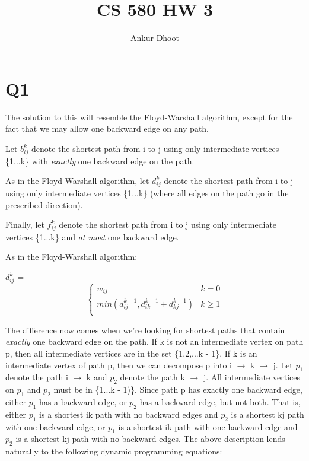 \documentclass[11pt,a4paper]{article}
\begin{document}
\author{Ankur Dhoot}
\title{CS 580 HW 3}
\maketitle

\section*{Q1}
The solution to this will resemble the Floyd-Warshall algorithm, except for the fact that we may allow one backward edge on any path. 

Let $b_{ij}^{k}$ denote the shortest path from i to j using only intermediate vertices \{1...k\} with \textit{exactly} one backward edge on the path. 

As in the Floyd-Warshall algorithm, let $d_{ij}^{k}$ denote the shortest path from i to j using only intermediate vertices \{1...k\} (where all edges on the path go in the prescribed direction).

Finally, let $f_{ij}^{k}$ denote the shortest path from i to j using only intermediate vertices \{1...k\} and \textit{at most} one backward edge.

As in the Floyd-Warshall algorithm:

$d_{ij}^{k}$ = 
\[ \begin{cases} 
      w_{ij} & k = 0 \\
      min(d_{ij}^{k-1}, d_{ik}^{k-1} + d_{kj}^{k-1}) & k \geq 1 \\
   \end{cases}
\]

The difference now comes when we're looking for shortest paths that contain \textit{exactly} one backward edge on the path. If k is not an intermediate vertex on path p, then all intermediate vertices are in the set \{1,2,...k - 1\}. If k is an intermediate vertex of path p, then we can decompose p into i $\rightarrow$ k $\rightarrow$ j. Let $p_{1}$ denote the path i $\rightarrow$ k and $p_{2}$ denote the path k $\rightarrow$ j. All intermediate vertices on $p_{1}$ and $p_{2}$ must be in  \{1...k - 1)\}. Since path p has exactly one backward edge, either $p_{1}$ has a backward edge, or $p_{2}$ has a backward edge, but not both. That is, either $p_{1}$ is a shortest ik path with no backward edges and $p_{2}$ is a shortest kj path with one backward edge, or $p_{1}$ is a shortest ik path with one backward edge and $p_{2}$ is a shortest kj path with no backward edges. The above description lends naturally to the following dynamic programming equations:
\end{document}
